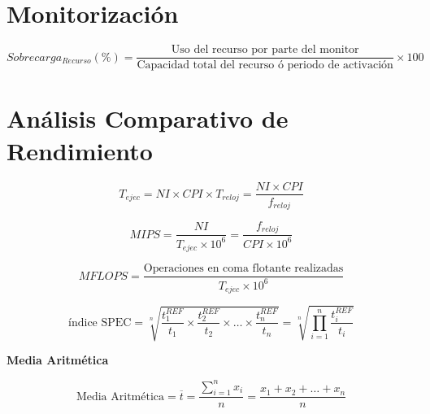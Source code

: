 \documentclass[a4paper,12pt]{article}
\begin{document}
\section*{Monitorización}

\begin{tcolorbox}[colback=yellow!5!white, colframe=yellow!75!black]
    $$
    Sobrecarga_{Recurso}(\%) = \frac{\text{Uso del recurso por parte del monitor}}{\text{Capacidad total del recurso ó periodo de activación}} \times 100 
    $$
    \end{tcolorbox}


\section*{Análisis Comparativo de Rendimiento}

    \begin{tcolorbox}[colback=yellow!5!white, colframe=yellow!75!black]
    $$
    T_{ejec} = NI \times CPI \times T_{reloj} = \frac{NI \times CPI}{ f_{reloj}}
    $$
    \end{tcolorbox}

    \begin{tcolorbox}[colback=yellow!5!white, colframe=yellow!75!black]
    $$
    MIPS = \frac{NI}{T_{ejec}\times 10^6} = \frac{f_{reloj}}{CPI \times 10^6}
    $$
    \end{tcolorbox}


    \begin{tcolorbox}[colback=yellow!5!white, colframe=yellow!75!black]
    $$
    MFLOPS = \frac{\text{Operaciones en coma flotante realizadas}}{T_{ejec} \times 10^6}
    $$
    \end{tcolorbox}


    \begin{tcolorbox}[colback=yellow!5!white, colframe=yellow!75!black]
    $$
    \text{índice SPEC} = \sqrt[n]{\frac{t_1^{REF}}{t_1}\times \frac{t_2^{REF}}{t_2}\times \ldots \times \frac{t_n^{REF}}{t_n}} = \sqrt[n]{\prod_{i=1}^n \frac{t_i^{REF}}{t_i}}
    $$
    \end{tcolorbox}
    
    \textbf{Media Aritmética}


    
    \begin{tcolorbox}[colback=yellow!5!white, colframe=yellow!75!black]
    $$
    \text{Media Aritmética} = \overline{t}= \frac{\sum_{i=1}^n x_i}{n} = \frac{x_1+x_2+\ldots+x_n}{n}
    $$
    \end{tcolorbox}
\end{document}
